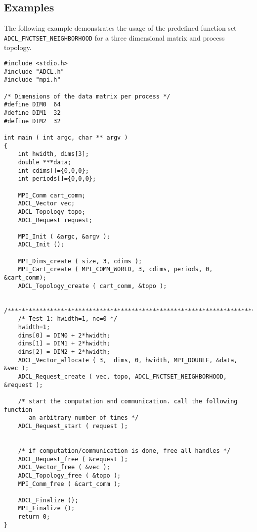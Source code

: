 %    

\subsection{Examples}

The following example demonstrates the usage of the predefined function set {\tt ADCL\_FNCTSET\_NEIGHBORHOOD} for a three dimensional matrix and process topology.

\begin{verbatim}
#include <stdio.h>
#include "ADCL.h"
#include "mpi.h"

/* Dimensions of the data matrix per process */
#define DIM0  64
#define DIM1  32
#define DIM2  32

int main ( int argc, char ** argv ) 
{
    int hwidth, dims[3];
    double ***data;
    int cdims[]={0,0,0};
    int periods[]={0,0,0};
    
    MPI_Comm cart_comm;
    ADCL_Vector vec;
    ADCL_Topology topo;
    ADCL_Request request;

    MPI_Init ( &argc, &argv );
    ADCL_Init ();
    
    MPI_Dims_create ( size, 3, cdims );
    MPI_Cart_create ( MPI_COMM_WORLD, 3, cdims, periods, 0, &cart_comm);
    ADCL_Topology_create ( cart_comm, &topo );

    /**********************************************************************/
    /* Test 1: hwidth=1, nc=0 */
    hwidth=1;
    dims[0] = DIM0 + 2*hwidth;
    dims[1] = DIM1 + 2*hwidth;
    dims[2] = DIM2 + 2*hwidth;
    ADCL_Vector_allocate ( 3,  dims, 0, hwidth, MPI_DOUBLE, &data, &vec );
    ADCL_Request_create ( vec, topo, ADCL_FNCTSET_NEIGHBORHOOD, &request );
    
    /* start the computation and communication. call the following function
       an arbitrary number of times */ 
    ADCL_Request_start ( request );


    /* if computation/communication is done, free all handles */
    ADCL_Request_free ( &request );
    ADCL_Vector_free ( &vec );
    ADCL_Topology_free ( &topo );
    MPI_Comm_free ( &cart_comm );
    
    ADCL_Finalize ();
    MPI_Finalize ();
    return 0;
}
\end{verbatim}